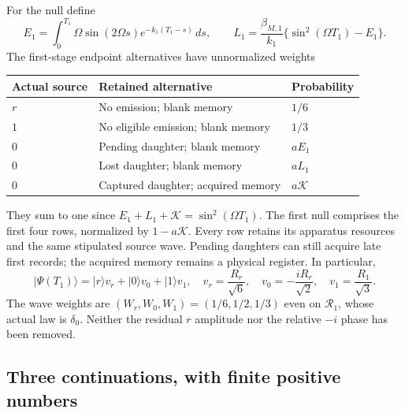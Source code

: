 \documentclass[11pt,oneside,openany]{book}
\theoremstyle{definition}
\theoremstyle{remark}\newtheorem{remark}[theorem]{Remark}
\begin{document}
For the null define
\[
 E_1=\int_0^{T_1}\Omega\sin(2\Omega s)e^{-k_1(T_1-s)}\,ds,\qquad
 L_1=\frac{\beta_{M,1}}{k_1}
                 \{\sin^2(\Omega T_1)-E_1\}.
\]
The first-stage endpoint alternatives have unnormalized weights
\begin{center}
\begin{tabular}{@{}lll@{}}
\toprule
Actual source & Retained alternative & Probability\\
\midrule
$r$ & No emission; blank memory & $1/6$\\
$1$ & No eligible emission; blank memory & $1/3$\\
$0$ & Pending daughter; blank memory & $aE_1$\\
$0$ & Lost daughter; blank memory & $aL_1$\\
$0$ & Captured daughter; acquired memory & $a\mathcal K$\\
\bottomrule
\end{tabular}
\end{center}
They sum to one since $E_1+L_1+\mathcal K=\sin^2(\Omega T_1)$.
The first null comprises the first four rows, normalized by
$1-a\mathcal K$. Every row retains its apparatus resources and the
same stipulated source wave. Pending daughters can still acquire
late first records; the acquired memory remains a physical register.
In particular,
\begin{equation}
 |\Psi(T_1)\rangle=|r\rangle v_r+|0\rangle v_0+|1\rangle v_1,
 \quad v_r=\frac{R_r}{\sqrt6},\quad
 v_0=-\frac{iR_r}{\sqrt2},\quad v_1=\frac{R_1}{\sqrt3}.
 \label{bench:history-endpoint}
\end{equation}
The wave weights are $(W_r,W_0,W_1)=(1/6,1/2,1/3)$ even on
$\mathcal R_1$, whose actual law is $\delta_0$. Neither the residual
$r$ amplitude nor the relative $-i$ phase has been removed.

\subsection{Three continuations, with finite positive numbers}
\end{document}
